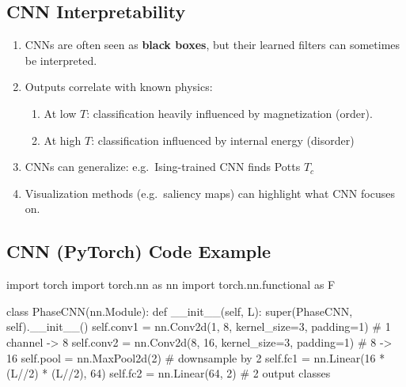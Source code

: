 \documentclass[%
oneside,                 %
final,                   %
10pt]{article}
\begin{document}
\noindent
\subsection{CNN Interpretability}
\begin{enumerate}
\item CNNs are often seen as \textbf{black boxes}, but their learned filters can sometimes be interpreted.

\item Outputs correlate with known physics:
\begin{enumerate}

 \item At low $T$: classification heavily influenced by magnetization (order).

 \item At high $T$: classification influenced by internal energy (disorder) 

\end{enumerate}

\noindent
\item CNNs can generalize: e.g.\ Ising-trained CNN finds Potts $T_c$ 

\item Visualization methods (e.g.\ saliency maps) can highlight what CNN focuses on.
\end{enumerate}

\noindent
\subsection{CNN (PyTorch) Code Example}


























\bpycod
import torch
import torch.nn as nn
import torch.nn.functional as F

class PhaseCNN(nn.Module):
   def __init__(self, L):
       super(PhaseCNN, self).__init__()
       self.conv1 = nn.Conv2d(1, 8, kernel_size=3, padding=1)  # 1 channel -> 8
       self.conv2 = nn.Conv2d(8, 16, kernel_size=3, padding=1) # 8 -> 16
       self.pool = nn.MaxPool2d(2)  # downsample by 2
       self.fc1 = nn.Linear(16 * (L//2) * (L//2), 64)
       self.fc2 = nn.Linear(64, 2)  # 2 output classes
\end{document}

